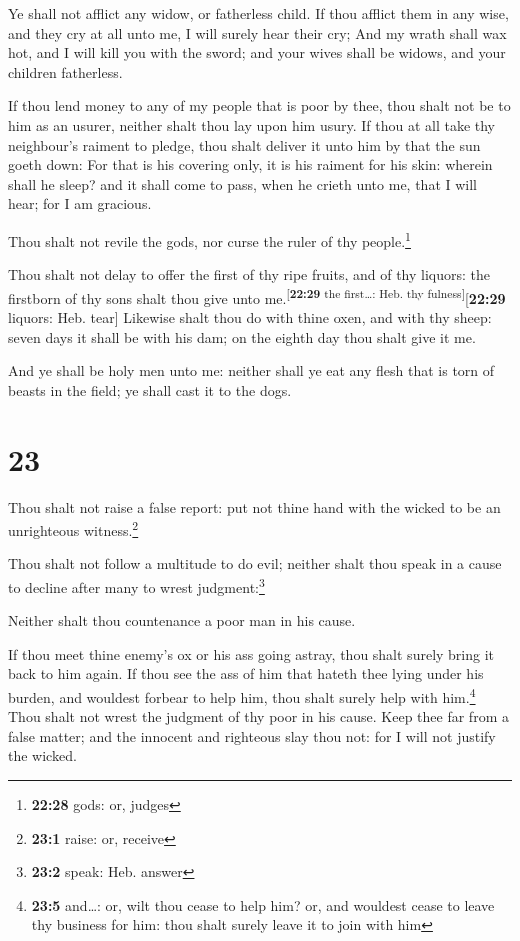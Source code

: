  Ye shall not afflict any widow, or fatherless child.
 If thou afflict them in any wise, and they cry at all
unto me, I will surely hear their cry;  And my wrath
shall wax hot, and I will kill you with the sword; and your wives shall
be widows, and your children fatherless.

 If thou lend money to any of my people that is poor by
thee, thou shalt not be to him as an usurer, neither shalt thou lay upon
him usury.  If thou at all take thy neighbour's raiment
to pledge, thou shalt deliver it unto him by that the sun goeth down:
 For that is his covering only, it is his raiment for his
skin: wherein shall he sleep? and it shall come to pass, when he crieth
unto me, that I will hear; for I am gracious.

 Thou shalt not revile the gods, nor curse the ruler of
thy people.\footnote{\textbf{22:28} gods: or, judges}

 Thou shalt not delay to offer the first of thy ripe
fruits, and of thy liquors: the firstborn of thy sons shalt thou give
unto me.\textsuperscript{{[}\textbf{22:29} the first\ldots: Heb. thy
fulness{]}}{[}\textbf{22:29} liquors: Heb. tear{]} 
Likewise shalt thou do with thine oxen, and with thy sheep: seven days
it shall be with his dam; on the eighth day thou shalt give it me.

 And ye shall be holy men unto me: neither shall ye eat
any flesh that is torn of beasts in the field; ye shall cast it to the
dogs.

\hypertarget{section-22}{%
\section{23}\label{section-22}}

 Thou shalt not raise a false report: put not thine hand
with the wicked to be an unrighteous witness.\footnote{\textbf{23:1}
  raise: or, receive}

 Thou shalt not follow a multitude to do evil; neither
shalt thou speak in a cause to decline after many to wrest
judgment:\footnote{\textbf{23:2} speak: Heb. answer}

 Neither shalt thou countenance a poor man in his cause.

 If thou meet thine enemy's ox or his ass going astray,
thou shalt surely bring it back to him again.  If thou see
the ass of him that hateth thee lying under his burden, and wouldest
forbear to help him, thou shalt surely help with him.\footnote{\textbf{23:5}
  and\ldots: or, wilt thou cease to help him? or, and wouldest cease to
  leave thy business for him: thou shalt surely leave it to join with
  him}  Thou shalt not wrest the judgment of thy poor in
his cause.  Keep thee far from a false matter; and the
innocent and righteous slay thou not: for I will not justify the wicked.

